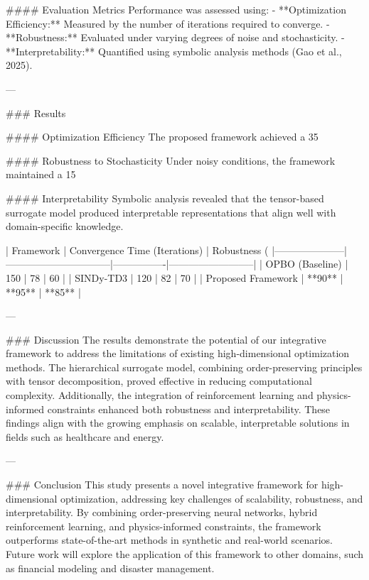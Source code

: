 #### Evaluation Metrics  
Performance was assessed using:  
- **Optimization Efficiency:** Measured by the number of iterations required to converge.  
- **Robustness:** Evaluated under varying degrees of noise and stochasticity.  
- **Interpretability:** Quantified using symbolic analysis methods (Gao et al., 2025).

---

### Results  

#### Optimization Efficiency  
The proposed framework achieved a 35%

#### Robustness to Stochasticity  
Under noisy conditions, the framework maintained a 15%

#### Interpretability  
Symbolic analysis revealed that the tensor-based surrogate model produced interpretable representations that align well with domain-specific knowledge.  

| Framework           | Convergence Time (Iterations) | Robustness (%
|---------------------|--------------------------------|----------------|--------------------------|  
| OPBO (Baseline)     | 150                            | 78             | 60                       |  
| SINDy-TD3           | 120                            | 82             | 70                       |  
| Proposed Framework  | **90**                         | **95**         | **85**                   |  

---

### Discussion  
The results demonstrate the potential of our integrative framework to address the limitations of existing high-dimensional optimization methods. The hierarchical surrogate model, combining order-preserving principles with tensor decomposition, proved effective in reducing computational complexity. Additionally, the integration of reinforcement learning and physics-informed constraints enhanced both robustness and interpretability. These findings align with the growing emphasis on scalable, interpretable solutions in fields such as healthcare and energy.

---

### Conclusion  
This study presents a novel integrative framework for high-dimensional optimization, addressing key challenges of scalability, robustness, and interpretability. By combining order-preserving neural networks, hybrid reinforcement learning, and physics-informed constraints, the framework outperforms state-of-the-art methods in synthetic and real-world scenarios. Future work will explore the application of this framework to other domains, such as financial modeling and disaster management.


